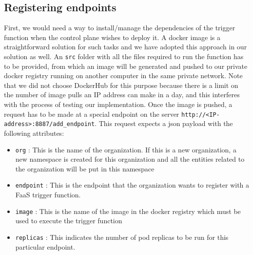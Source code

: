 \documentclass{article}
\begin{document}
\subsection{Registering endpoints}
First, we would need a way to install/manage the dependencies of the trigger function when the control plane wishes to deploy it. A docker image is a straightforward solution for such tasks and we have adopted this approach in our solution as well. An \texttt{src} folder with all the files required to run the function has to be provided, from which an image will be generated and pushed to our private docker registry running on another computer in the same private network. Note that we did not choose DockerHub for this purpose because there is a limit on the number of image pulls an IP address can make in a day, and this interferes with the process of testing our implementation. Once the image is pushed, a request has to be made at a special endpoint on the server \texttt{http://<IP-address>:8887/add\_endpoint}. This request expects a json payload with the following attributes:
\begin{itemize}
    \item \texttt{org} : This is the name of the organization. If this is a new organization, a new namespace is created for this organization and all the entities related to the organization will be put in this namespace
    \item \texttt{endpoint} : This is the endpoint that the organization wants to register with a FaaS trigger function.
    \item \texttt{image} : This is the name of the image in the docker registry which must be used to execute the trigger function
    \item \texttt{replicas} : This indicates the number of pod replicas to be run for this particular endpoint.
\end{itemize}
\end{document}
